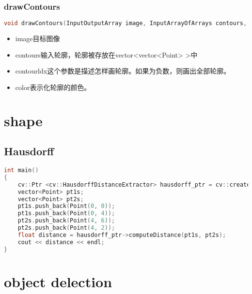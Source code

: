 \documentclass[12pt]{article}
\begin{document}
\subsubsection{drawContours}
\begin{lstlisting}[language=c++]
void drawContours(InputOutputArray image, InputArrayOfArrays contours, int contourIdx, const Scalar& color, int thickness=1, int lineType=LINE_8, InputArray hierarchy=noArray(), int maxLevel=INT_MAX, Point offset=Point() )
\end{lstlisting}
\begin{itemize}
\item image目标图像
\item contours输入轮廓，轮廓被存放在vector<vector<Point> >中
\item contourldx这个参数是描述怎样画轮廓。如果为负数，则画出全部轮廓。
\item color表示化轮廓的颜色。
\end{itemize}




\section{shape}

\subsection{Hausdorff}
\begin{lstlisting}[language=c++]
int main()
{
    cv::Ptr <cv::HausdorffDistanceExtractor> hausdorff_ptr = cv::createHausdorffDistanceExtractor();
    vector<Point> pt1s;
    vector<Point> pt2s;
    pt1s.push_back(Point(0, 0));
    pt1s.push_back(Point(0, 4));
    pt2s.push_back(Point(4, 6));
    pt2s.push_back(Point(4, 2));
    float distance = hausdorff_ptr->computeDistance(pt1s, pt2s);
    cout << distance << endl;
}
\end{lstlisting}



\section{object delection}
\end{document}
